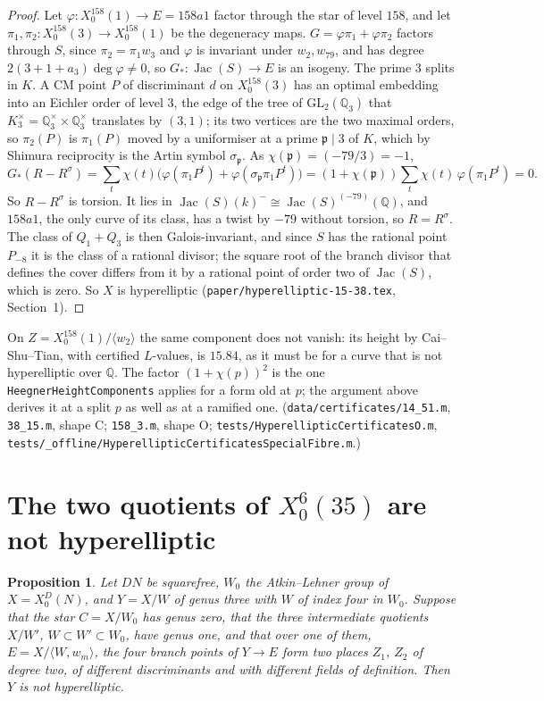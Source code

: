 \documentclass[11pt,reqno]{amsart}
\theoremstyle{plain}
\newtheorem{proposition}[theorem]{Proposition}
\theoremstyle{definition}
\DeclareMathOperator{\Jac}{Jac}
\newcommand{\Q}{\mathbb{Q}}
\begin{document}
\begin{proof}
Let $\varphi\colon X_0^{158}(1)\to E=158a1$ factor through the star of level $158$, and let
$\pi_1,\pi_2\colon X_0^{158}(3)\to X_0^{158}(1)$ be the degeneracy maps. $G=\varphi\pi_1+\varphi\pi_2$ factors through
$S$, since $\pi_2=\pi_1w_3$ and $\varphi$ is invariant under $w_2,w_{79}$, and has degree
$2(3+1+a_3)\deg\varphi\neq0$, so $G_*\colon\Jac(S)\to E$ is an isogeny. The prime $3$ splits in $K$. A CM point
$P$ of discriminant $d$ on $X_0^{158}(3)$ has an optimal embedding into an Eichler order of level $3$, the edge of
the tree of $\mathrm{GL}_2(\Q_3)$ that $K_3^\times=\Q_3^\times\times\Q_3^\times$ translates by $(3,1)$; its two
vertices are the two maximal orders, so $\pi_2(P)$ is $\pi_1(P)$ moved by a uniformiser at a prime $\mathfrak p\mid
3$ of $K$, which by Shimura reciprocity is the Artin symbol $\sigma_{\mathfrak p}$. As
$\chi(\mathfrak p)=(-79/3)=-1$,
\[
  G_*(R-R^\sigma)=\sum_t\chi(t)\bigl(\varphi(\pi_1P^t)+\varphi(\sigma_{\mathfrak p}\pi_1P^t)\bigr)
  =(1+\chi(\mathfrak p))\sum_t\chi(t)\,\varphi(\pi_1P^t)=0 .
\]
So $R-R^\sigma$ is torsion. It lies in $\Jac(S)(k)^-\cong\Jac(S)^{(-79)}(\Q)$, and $158a1$, the only curve of its
class, has a twist by $-79$ without torsion, so $R=R^\sigma$. The class of $Q_1+Q_3$ is then Galois-invariant,
and since $S$ has the rational point $P_{-8}$ it is the class of a rational divisor; the square root of the
branch divisor that defines the cover differs from it by a rational point of order two of $\Jac(S)$, which is
zero. So $X$ is hyperelliptic (\texttt{paper/hyperelliptic-15-38.tex}, Section~1).
\end{proof}

On $Z=X_0^{158}(1)/\langle w_2\rangle$ the same component does not vanish: its height by Cai--Shu--Tian, with
certified $L$-values, is $15.84$, as it must be for a curve that is not hyperelliptic over $\Q$. The factor
$(1+\chi(p))^2$ is the one \texttt{HeegnerHeightComponents} applies for a form old at $p$; the argument above
derives it at a split $p$ as well as at a ramified one. (\texttt{data/certificates/14\_51.m}, \texttt{38\_15.m},
shape C; \texttt{158\_3.m}, shape O; \texttt{tests/HyperellipticCertificatesO.m},
\texttt{tests/\_offline/HyperellipticCertificatesSpecialFibre.m}.)

\section{The two quotients of $X_0^6(35)$ are not hyperelliptic}

\begin{proposition}\label{prop:kleinfour}
Let $DN$ be squarefree, $W_0$ the Atkin--Lehner group of $X=X_0^D(N)$, and $Y=X/W$ of genus three with $W$ of
index four in $W_0$. Suppose that the star $C=X/W_0$ has genus zero, that the three intermediate quotients
$X/W'$, $W\subset W'\subset W_0$, have genus one, and that over one of them, $E=X/\langle W,w_m\rangle$, the four
branch points of $Y\to E$ form two places $Z_1$, $Z_2$ of degree two, of different discriminants and with
different fields of definition. Then $Y$ is not hyperelliptic.
\end{proposition}
\end{document}
